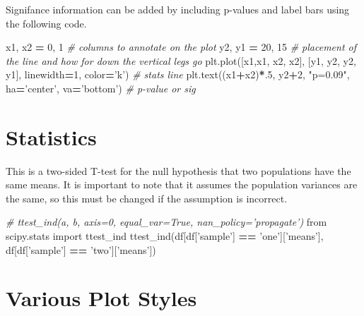 \documentclass[]{book}
\newenvironment{Shaded}{\begin{snugshade}}{\end{snugshade}}
\newcommand{\DecValTok}[1]{\textcolor[rgb]{0.00,0.00,0.81}{#1}}
\newcommand{\StringTok}[1]{\textcolor[rgb]{0.31,0.60,0.02}{#1}}
\newcommand{\ImportTok}[1]{#1}
\newcommand{\CommentTok}[1]{\textcolor[rgb]{0.56,0.35,0.01}{\textit{#1}}}
\newcommand{\OperatorTok}[1]{\textcolor[rgb]{0.81,0.36,0.00}{\textbf{#1}}}
\newcommand{\NormalTok}[1]{#1}
\begin{document}
Signifance information can be added by including p-values and label bars
using the following code.

\begin{Shaded}
\begin{Highlighting}[]
\NormalTok{x1, x2 }\OperatorTok{=} \DecValTok{0}\NormalTok{, }\DecValTok{1} \CommentTok{# columns to annotate on the plot}
\NormalTok{y2, y1 }\OperatorTok{=} \DecValTok{20}\NormalTok{, }\DecValTok{15} \CommentTok{# placement of the line and how for down the vertical legs go}
\NormalTok{plt.plot([x1,x1, x2, x2], [y1, y2, y2, y1], linewidth}\OperatorTok{=}\DecValTok{1}\NormalTok{, color}\OperatorTok{=}\StringTok{'k'}\NormalTok{) }\CommentTok{# stats line}
\NormalTok{plt.text((x1}\OperatorTok{+}\NormalTok{x2)}\OperatorTok{*}\NormalTok{.}\DecValTok{5}\NormalTok{, y2}\OperatorTok{+}\DecValTok{2}\NormalTok{, }\StringTok{"p=0.09"}\NormalTok{, ha}\OperatorTok{=}\StringTok{'center'}\NormalTok{, va}\OperatorTok{=}\StringTok{'bottom'}\NormalTok{) }\CommentTok{# p-value or sig}
\end{Highlighting}
\end{Shaded}

\section{Statistics}\label{statistics}

This is a two-sided T-test for the null hypothesis that two populations
have the same means. It is important to note that it assumes the
population variances are the same, so this must be changed if the
assumption is incorrect.

\begin{Shaded}
\begin{Highlighting}[]
\CommentTok{# ttest_ind(a, b, axis=0, equal_var=True, nan_policy='propagate')}
\ImportTok{from}\NormalTok{ scipy.stats }\ImportTok{import}\NormalTok{ ttest_ind}
\NormalTok{ttest_ind(df[df[}\StringTok{'sample'}\NormalTok{] }\OperatorTok{==} \StringTok{'one'}\NormalTok{][}\StringTok{'means'}\NormalTok{], df[df[}\StringTok{'sample'}\NormalTok{] }\OperatorTok{==} \StringTok{'two'}\NormalTok{][}\StringTok{'means'}\NormalTok{])}
\end{Highlighting}
\end{Shaded}

\section{Various Plot Styles}\label{various-plot-styles}
\end{document}
